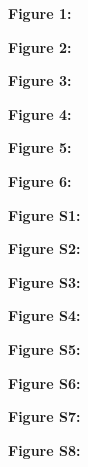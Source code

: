 \documentclass[12pt,]{article}
\begin{document}
\newpage

\textbf{Figure 1: }

\textbf{Figure 2: }

\textbf{Figure 3: }

\textbf{Figure 4: }

\textbf{Figure 5: }

\textbf{Figure 6: }

\newpage

\textbf{Figure S1: }

\textbf{Figure S2: }

\textbf{Figure S3: }

\textbf{Figure S4: }

\textbf{Figure S5: }

\textbf{Figure S6: }

\textbf{Figure S7: }

\textbf{Figure S8: }

\newpage
\end{document}

